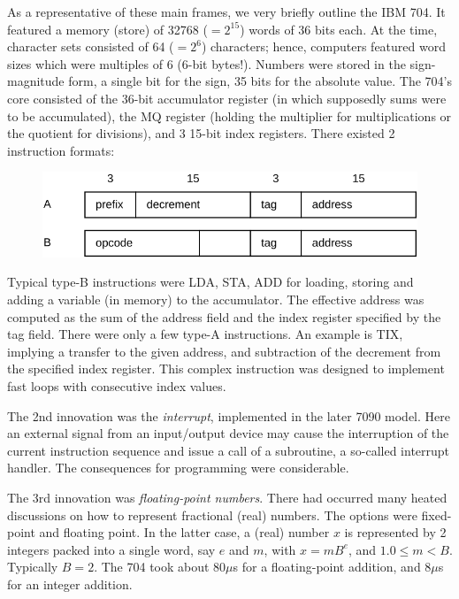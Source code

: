 As a representative of these main frames, we very briefly outline the IBM 704. It
featured a memory (store) of 32768 ($=2^{15}$) words of 36 bits each. At the time,
character sets consisted of 64 ($=2^6$) characters; hence, computers featured word
sizes which were multiples of 6 (6-bit bytes!). Numbers were stored in the
sign-magnitude form, a single bit for the sign, 35 bits for the absolute value.
The 704's core consisted of the 36-bit accumulator register (in which supposedly
sums were to be accumulated), the MQ register (holding the multiplier for
multiplications or the quotient for divisions), and 3 15-bit index registers.
There existed 2 instruction formats:
\begin{figure}[h!]
  \centering
  \includegraphics[width=.9\textwidth]{i/1}
\end{figure}
 
Typical type-B instructions were LDA, STA, ADD for loading, storing and adding a
variable (in memory) to the accumulator. The effective address was computed as the
sum of the address field and the index register specified by the tag field. There
were only a few type-A instructions. An example is TIX, implying a transfer to the
given address, and subtraction of the decrement from the specified index register.
This complex instruction was designed to implement fast loops with consecutive
index values.

The 2nd innovation was the \emph{interrupt}, implemented in the later 7090 model.
Here an external signal from an input/output device may cause the interruption of
the current instruction sequence and issue a call of a subroutine, a so-called
interrupt handler. The consequences for programming were considerable.

The 3rd innovation was \emph{floating-point numbers}. There had occurred many heated
discussions on how to represent fractional (real) numbers. The options were fixed-point
and floating point. In the latter case, a (real) number $x$ is represented by 2
integers packed into a single word, say $e$ and $m$, with $x = m B^e$, and $1.0 \le m
< B$. Typically $B = 2$. The 704 took about $80 \mu$s for a floating-point addition,
and $8 \mu$s for an integer addition.

